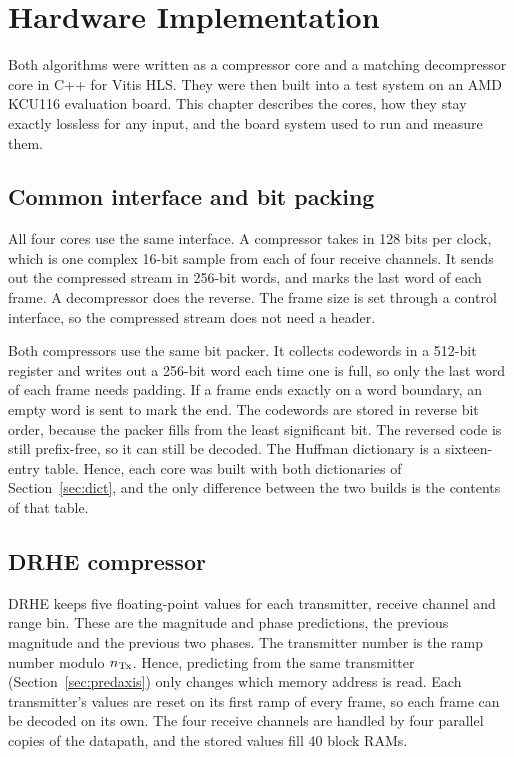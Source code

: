 \chapter{Hardware Implementation}
\label{ch:hardware}

Both algorithms were written as a compressor core and a matching decompressor
core in C++ for Vitis HLS. They were then built into a test system on an AMD
KCU116 evaluation board. This chapter describes the cores, how they stay
exactly lossless for any input, and the board system used to run and measure
them.

\section{Common interface and bit packing}
\label{sec:interface}

All four cores use the same interface. A compressor takes in 128 bits per
clock, which is one complex 16-bit sample from each of four receive channels.
It sends out the compressed stream in 256-bit words, and marks the last word of
each frame. A decompressor does the reverse. The frame size is set through a
control interface, so the compressed stream does not need a header.

Both compressors use the same bit packer. It collects codewords in a 512-bit
register and writes out a 256-bit word each time one is full, so only the last
word of each frame needs padding. If a frame ends exactly on a word boundary,
an empty word is sent to mark the end. The codewords are stored in reverse bit
order, because the packer fills from the least significant bit. The reversed
code is still prefix-free, so it can still be decoded. The Huffman dictionary
is a sixteen-entry table. Hence, each core was built with both dictionaries of
Section~\ref{sec:dict}, and the only difference between the two builds is the
contents of that table.

\section{DRHE compressor}
\label{sec:drheimpl}

DRHE keeps five floating-point values for each transmitter, receive channel and
range bin. These are the magnitude and phase predictions, the previous
magnitude and the previous two phases. The transmitter number is the ramp
number modulo $n_{\mathrm{Tx}}$. Hence, predicting from the same transmitter
(Section~\ref{sec:predaxis}) only changes which memory address is read. Each
transmitter's values are reset on its first ramp of every frame, so each frame
can be decoded on its own. The four receive channels are handled by four
parallel copies of the datapath, and the stored values fill 40 block RAMs.

